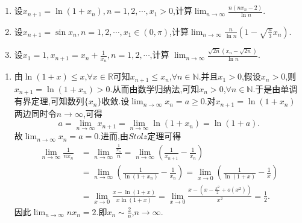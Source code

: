 \documentclass[../../main.tex]{subfiles}
\begin{document}
\begin{example}
\begin{enumerate}
\item 设\(x_{n + 1} = \ln(1 + x_n), n = 1, 2, \cdots, x_1 > 0\),计算\(\lim_{n \to \infty} \frac{n(nx_n - 2)}{\ln n}\).

\item 设\(x_{n + 1} = \sin x_n, n = 1, 2, \cdots, x_1 \in (0, \pi)\),计算\(\lim_{n \to \infty} \frac{n}{\ln n}(1 - \sqrt{\frac{n}{3}}x_n)\).

\item 设\(x_1 = 1, x_{n + 1} = x_n + \frac{1}{x_n}, n = 1, 2, \cdots\),计算
\(\lim_{n \to \infty} \frac{\sqrt{2n}(x_n - \sqrt{2n})}{\ln n}\).
\end{enumerate}
\end{example}
\begin{solution}
\begin{enumerate}
\item 由\(\ln(1 + x) \leq x\),\(\forall x\in\mathbb{R}\)可知\(x_{n + 1} \leq x_n\),\(\forall n\in\mathbb{N}\).并且\(x_1 > 0\),假设\(x_n > 0\),则\(x_{n + 1} = \ln(1 + x_n) > 0\).从而由数学归纳法,可知\(x_n > 0\),\(\forall n\in\mathbb{N}\).于是由单调有界定理,可知数列\(\{x_n\}\)收敛.设\(\lim_{n\rightarrow\infty}x_n = a\geq0\).对\(x_{n + 1} = \ln(1 + x_n)\)两边同时令\(n\rightarrow\infty\),可得
\[
a = \lim_{n\rightarrow\infty}x_{n + 1} = \lim_{n\rightarrow\infty}\ln(1 + x_n) = \ln(1 + a).
\]
故\(\lim_{n\rightarrow\infty}x_n = a = 0\).进而,由\(Stolz\)定理可得
\begin{align*}
\lim_{n\rightarrow\infty}\frac{1}{nx_n}&=\lim_{n\rightarrow\infty}\frac{\frac{1}{x_n}}{n}=\lim_{n\rightarrow\infty}\left(\frac{1}{x_{n + 1}} - \frac{1}{x_n}\right)\\
&=\lim_{n\rightarrow\infty}\left(\frac{1}{\ln(1 + x_n)} - \frac{1}{x_n}\right)=\lim_{x\rightarrow0}\left(\frac{1}{\ln(1 + x)} - \frac{1}{x}\right)\\
&=\lim_{x\rightarrow0}\frac{x - \ln(1 + x)}{x\ln(1 + x)}=\lim_{x\rightarrow0}\frac{x - \left(x - \frac{x^2}{2} + o(x^2)\right)}{x^2}=\frac{1}{2}.
\end{align*}
因此\(\lim_{n\rightarrow\infty}nx_n = 2\).即\(x_n\sim\frac{2}{n}\),\(n\rightarrow\infty\).


\end{enumerate}
\end{solution}
\end{document}
